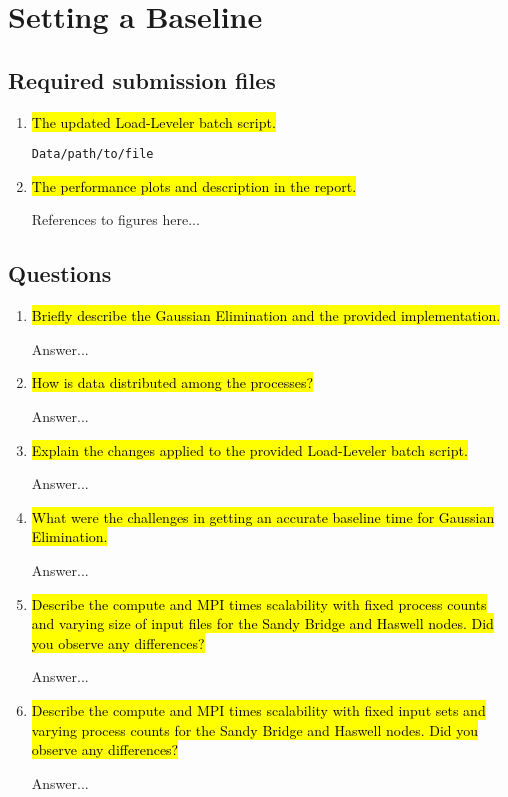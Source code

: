 \section{Setting a Baseline}
\subsection{Required submission files}
\begin{enumerate}
	\item \hl{The updated Load-Leveler batch script.}

		\verb!Data/path/to/file!

	\item \hl{The performance plots and description in the report.}

		References to figures here...

\end{enumerate}

\subsection{Questions}
\begin{enumerate}
	\item \hl{Briefly describe the Gaussian Elimination and the provided implementation.}

	Answer...

	\item \hl{How is data distributed among the processes?}

	Answer...

	\item \hl{Explain the changes applied to the provided Load-Leveler batch script.}

	Answer...

	\item \hl{What were the challenges in getting an accurate baseline time for Gaussian Elimination.}

	Answer...

	\item \hl{Describe the compute and MPI times scalability with fixed process counts and varying size of input files for the Sandy Bridge and Haswell nodes. Did you observe any differences?}

	Answer...

	\item \hl{Describe the compute and MPI times scalability with fixed input sets and varying process counts for the Sandy Bridge and Haswell nodes. Did you observe any differences?}

	Answer...

\end{enumerate}

